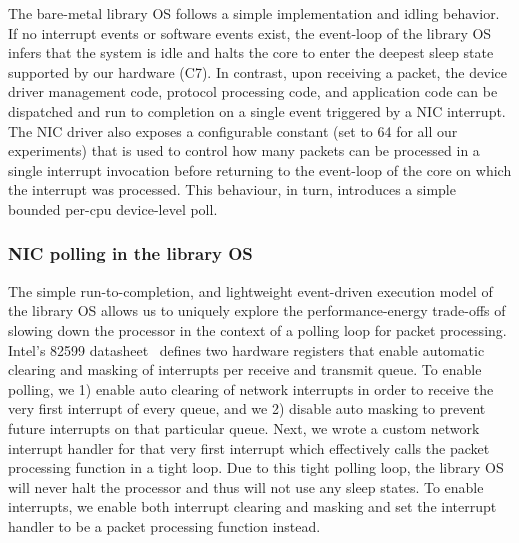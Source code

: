 The bare-metal library OS follows a simple implementation and idling behavior. If no interrupt events or software events exist, the event-loop of the library OS infers that the system is idle and halts the core to enter the deepest sleep state supported by our hardware (C7). In contrast, upon receiving a packet, the device driver management code, protocol processing code, and application code can be dispatched and run to completion on a single event triggered by a NIC interrupt. The NIC driver also exposes a configurable constant (set to 64 for all our experiments) that is used to control how many packets can be processed in a single interrupt invocation before returning to the event-loop of the core on which the interrupt was processed. This behaviour, in turn, introduces a simple bounded per-cpu device-level poll. %
\subsubsection{NIC polling in the library OS}
The simple run-to-completion, and lightweight event-driven execution model of the library OS allows us to uniquely explore the performance-energy trade-offs of slowing down the processor in the context of a polling loop for packet processing. Intel's 82599 datasheet~\cite{82599} defines two hardware registers that enable automatic clearing and masking of interrupts per receive and transmit queue. To enable polling, we 1) enable auto clearing of network interrupts in order to receive the very first interrupt of every queue, and we 2) disable auto masking to prevent future interrupts on that particular queue. Next, we wrote a custom network interrupt handler for that very first interrupt which effectively calls the packet processing function in a tight loop. Due to this tight polling loop, the library OS will never halt the processor and thus will not use any sleep states. To enable interrupts, we enable both interrupt clearing and masking and set the interrupt handler to be a packet processing function instead.

